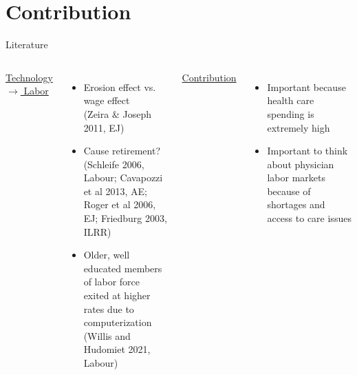 \documentclass[10pt]{beamer}
\begin{document}
\section{Contribution}

\begin{frame}{Literature}
\small
\begin{columns}
\setlength{\tabcolsep}{-5pt}
        \centering
        \underline{ Technology $\rightarrow$ Labor }
        \vspace{-1mm}
        \begin{itemize}
            \item Erosion effect vs. wage effect \\ \vspace{1mm}
            \tiny (Zeira $\&$ Joseph 2011, EJ)
            
            \footnotesize
            
            \item Cause retirement? \\ \vspace{1mm}
            \tiny (Schleife 2006, Labour; Cavapozzi et al 2013, AE; Roger et al 2006, EJ; Friedburg 2003, ILRR)
            
            \footnotesize
            
            \item Older, well educated members of labor force exited at higher rates due to computerization \\ \vspace{1mm}
            \tiny (Willis and Hudomiet 2021, Labour)
        \end{itemize}
        
        
        \centering
        
        \pause
        
        \color{blue}
        \underline{ Contribution }
        
        \vspace{1mm}
 
            \begin{itemize}
            \color{blue}
                \item Important because health care spending is extremely high
                \item Important to think about physician labor markets because of shortages and access to care issues
            \end{itemize}

        
\end{columns}
\end{frame}
\end{document}
